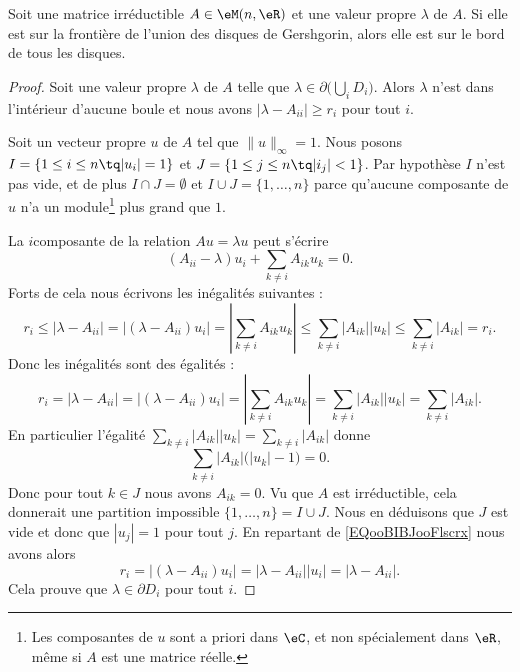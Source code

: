 \begin{theorem}      \label{THOooTXAPooQqsBCj}
    Soit une matrice irréductible \( A\in \eM(n,\eR)\) et une valeur propre \( \lambda\) de \( A\). Si elle est sur la frontière de l'union des disques de Gershgorin, alors elle est sur le bord de tous les disques.
\end{theorem}

\begin{proof}
    Soit une valeur propre \( \lambda\) de \( A\) telle que \( \lambda\in \partial\big( \bigcup_iD_i \big)\). Alors \( \lambda\) n'est dans l'intérieur d'aucune boule et nous avons \( | \lambda-A_{ii} |\geq r_i\) pour tout \( i\).

    Soit un vecteur propre \( u\) de \( A\) tel que \( \| u \|_{\infty}=1\). Nous posons \( I= \{ 1\leq i\leq n \tq | u_i |=1 \}  \) et \( J=\{ 1\leq j\leq n\tq | i_j |<1 \}\). Par hypothèse \( I\) n'est pas vide, et de plus \( I\cap J=\emptyset\) et \( I\cup J=\{ 1,\ldots, n \}\) parce qu'aucune composante de \( u\) n'a un module\footnote{Les composantes de \( u\) sont a priori dans \( \eC\), et non spécialement dans \( \eR\), même si \( A\) est une matrice réelle.} plus grand que \( 1\).

    La \( i\)\ieme composante de la relation \( Au=\lambda u\) peut s'écrire
    \begin{equation}
        (A_{ii}-\lambda)u_i+\sum_{k\neq i}A_{ik}u_k=0.
    \end{equation}
    Forts de cela nous écrivons les inégalités suivantes :
    \begin{equation}
        r_i\leq | \lambda-A_{ii} |=\big| (\lambda-A_{ii})u_i \big|=| \sum_{k\neq i}A_{ik}u_k |\leq \sum_{k\neq i}| A_{ik} | |u_k |\leq \sum_{k\neq i}| A_{ik} |=r_i.
    \end{equation}
    Donc les inégalités sont des égalités :
    \begin{equation}        \label{EQooBIBJooFlscrx}
        r_i= | \lambda-A_{ii} |=\big| (\lambda-A_{ii})u_i \big|=| \sum_{k\neq i}A_{ik}u_k |=\sum_{k\neq i}| A_{ik} | |u_k |=\sum_{k\neq i}| A_{ik} |.
    \end{equation}
    En particulier l'égalité \( \sum_{k\neq i}| A_{ik} | |u_k |=\sum_{k\neq i}| A_{ik} |\) donne
    \begin{equation}        
        \sum_{k\neq i}| A_{ik} |\big( | u_k |-1 \big)=0.
    \end{equation}
    Donc pour tout \( k\in J\) nous avons \( A_{ik}=0\). Vu que \( A\) est irréductible, cela donnerait une partition impossible \( \{ 1,\ldots, n \}=I\cup J\). Nous en déduisons que \( J\) est vide et donc que \( | u_j |=1\) pour tout $j$. En repartant de \eqref{EQooBIBJooFlscrx} nous avons alors
    \begin{equation}
        r_i=\big| (\lambda-A_{ii})u_i \big|=| \lambda-A_{ii} | |u_i |=| \lambda-A_{ii} |.
    \end{equation}
    Cela prouve que \( \lambda\in\partial D_i\) pour tout \( i\).
\end{proof}

